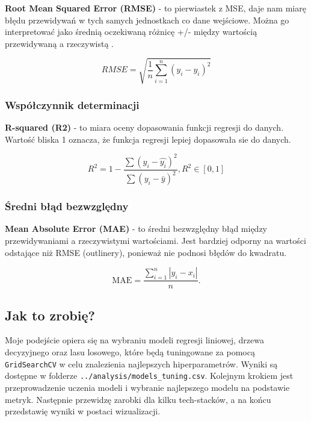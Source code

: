 \documentclass[a4paper]{article}
\begin{document}
\quad \textbf{Root Mean Squared Error (RMSE)} - to pierwiastek z MSE, daje nam miarę błędu przewidywań w tych samych jednostkach co dane wejściowe.
Można go interpretować jako średnią oczekiwaną różnicę +/- między wartością przewidywaną a rzeczywistą \cite{rmse}.

\begin{equation}
    RMSE = \sqrt{\frac{1}{n} \sum_{i=1}^{n} (y_i - \hat{y_i})^2}
\end{equation}

\subsubsection{Współczynnik determinacji}

\quad \textbf{R-squared (R2)} - to miara oceny dopasowania funkcji regresji do danych. Wartość bliska 1 oznacza, że funkcja regresji lepiej dopasowała sie do danych.

\begin{equation} R^2=1-\frac{\sum({y_i}-\hat{y_i})^2}{\sum(y_i-\bar{y})^2}, R^2 \in [0, 1] \end{equation}

\subsubsection{Średni błąd bezwzględny}

\quad \textbf{Mean Absolute Error (MAE)} - to średni bezwzględny błąd między przewidywaniami a rzeczywistymi wartościami.
Jest bardziej odporny na wartości odstające niż RMSE (outlinery), ponieważ nie podnosi błędów do kwadratu.

\begin{equation}
    {\displaystyle \mathrm {MAE} ={\frac {\sum _{i=1}^{n}\left|y_{i}-x_{i}\right|}{n}}.}
\end{equation}


\subsection{Jak to zrobię?}

\quad Moje podejście opiera się na wybraniu modeli regresji liniowej, drzewa decyzyjnego oraz lasu losowego, które będą
tuningowane za pomocą \texttt{GridSearchCV} w celu znalezienia najlepszych hiperparametrów. Wyniki są dostępne w folderze
\texttt{../analysis/models\_tuning.csv}. Kolejnym krokiem jest przeprowadzenie uczenia modeli i wybranie najlepszego modelu
na podstawie metryk. Następnie przewidzę zarobki dla kilku tech-stacków, a na końcu przedstawię wyniki w postaci wizualizacji.
\end{document}
